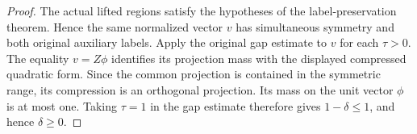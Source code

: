 \begin{proof}\leanok
{}
The actual lifted regions satisfy the hypotheses of the label-preservation
theorem. Hence the same normalized vector $v$ has simultaneous symmetry
and both original auxiliary labels. Apply the original gap estimate to
$v$ for each $\tau>0$. The equality $v=Z\phi$ identifies its projection
mass with the displayed compressed quadratic form. Since the common
projection is contained in the symmetric range, its compression is an
orthogonal projection. Its mass on the unit vector $\phi$ is at most one.
Taking $\tau=1$ in the gap estimate therefore gives $1-\delta\leq1$,
and hence $\delta\geq0$.
\end{proof}
